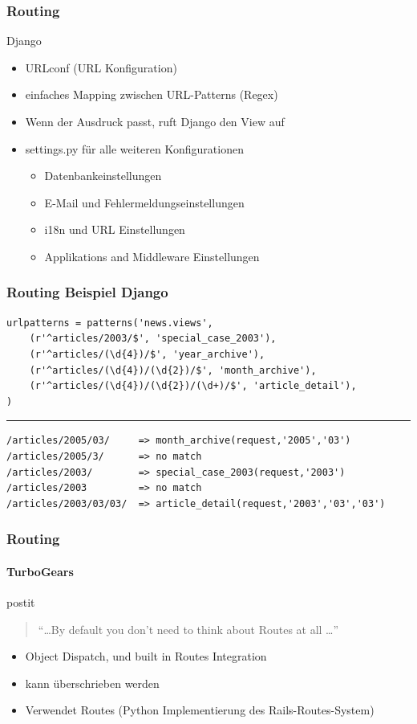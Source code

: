 \documentclass[
    t,
    smaller,
    compress,
    xcolor=svgnames,            %
    table,
]{beamer}
\newenvironment{beamerpostit}[1]%
{\begin{beamercolorbox}[wd=\textwidth,sep=2pt,rounded=true,shadow=true]{postit} #1}%
{\end{beamercolorbox}}%
\begin{document}
\begin{frame}
  \frametitle{Routing}
    Django
    \begin{itemize}[<1->]
        \item URLconf (URL Konfiguration)
        \item einfaches Mapping zwischen URL-Patterns (Regex)
        \item Wenn der Ausdruck passt, ruft Django den View auf
        \item settings.py für alle weiteren Konfigurationen
        \begin{itemize}[<1->]
            \item Datenbankeinstellungen
            \item E-Mail und Fehlermeldungseinstellungen
            \item i18n und URL Einstellungen
            \item Applikations and Middleware Einstellungen
        \end{itemize}
     \end{itemize}

\end{frame}

\begin{frame}[fragile]
\frametitle{Routing Beispiel Django}
\begin{lstlisting}
urlpatterns = patterns('news.views',
    (r'^articles/2003/$', 'special_case_2003'),
    (r'^articles/(\d{4})/$', 'year_archive'),
    (r'^articles/(\d{4})/(\d{2})/$', 'month_archive'),
    (r'^articles/(\d{4})/(\d{2})/(\d+)/$', 'article_detail'),
)
\end{lstlisting}
\hrule
    \vspace{10pt}
\begin{lstlisting}
/articles/2005/03/     => month_archive(request,'2005','03')
/articles/2005/3/      => no match
/articles/2003/        => special_case_2003(request,'2003')
/articles/2003         => no match
/articles/2003/03/03/  => article_detail(request,'2003','03','03')
    \end{lstlisting}
\end{frame}


\begin{frame}
  \frametitle{Routing}
\framesubtitle{TurboGears}

\begin{beamerpostit}
    \begin{quote}
      “\dots By default you don’t need to think about Routes at all \dots”
    \end{quote} %
  \end{beamerpostit}
    \vspace{15pt}
     \begin{itemize}[<1->]
        \item Object Dispatch, und built in Routes Integration
        \item kann überschrieben werden
        \item Verwendet Routes (Python Implementierung des Rails-Routes-System)
    \end{itemize}
\end{frame}
\end{document}

